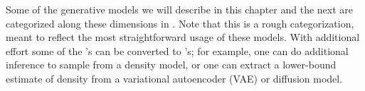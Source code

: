 Some of the generative models we will describe in this chapter and the next are categorized along these dimensions in \tab{\ref{tab:generative_models:types_of_gen_model}}. Note that this is a rough categorization, meant to reflect the most straightforward usage of these models. With additional effort some of the \xmark's can be converted to \checkmark's; for example, one can do additional inference to sample from a density model, or one can extract a lower-bound estimate of density from a variational autoencoder (VAE) or diffusion model.

